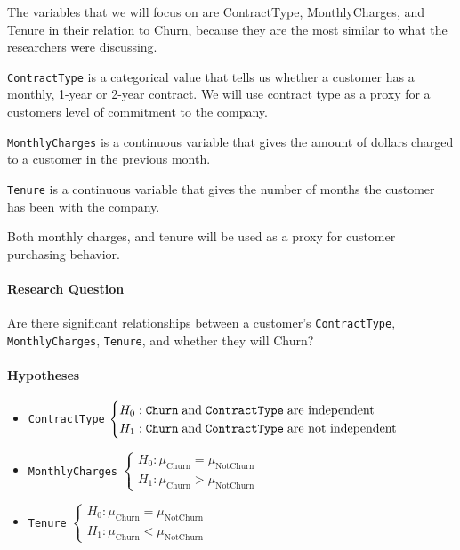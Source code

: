 \documentclass[man, floatsintext]{apa6}
\begin{document}
The variables that we will focus on are ContractType, MonthlyCharges, and Tenure in their relation to Churn, because they are the most similar to what the researchers were discussing.

\texttt{ContractType} is a categorical value that tells us whether a customer has a monthly, 1-year or 2-year contract. We will use contract type as a proxy for a customers level of commitment to the company.

\texttt{MonthlyCharges} is a continuous variable that gives the amount of dollars charged to a customer in the previous month.

\texttt{Tenure} is a continuous variable that gives the number of months the customer has been with the company.

Both monthly charges, and tenure will be used as a proxy for customer purchasing behavior.

\hspace{0.5mm}

\paragraph{Research Question}

Are there significant relationships between a customer's \texttt{ContractType}, \texttt{MonthlyCharges}, \texttt{Tenure}, and whether they will Churn?

\hspace{0.5mm}

\paragraph{Hypotheses}

\begin{itemize}
\item \texttt{ContractType} $\begin{cases}
H_0: \texttt{Churn} \hspace{1mm} \text{and}  \hspace{1mm} \texttt{ContractType} \hspace{1mm} \text{are independent} \\
H_1: \texttt{Churn} \hspace{1mm} \text{and} \hspace{1mm} \texttt{ContractType} \hspace{1mm} \text{are not independent}
\end{cases}$
\item \texttt{MonthlyCharges} $\begin{cases}
H_0: \mu_{\text{Churn}} = \mu_{\text{NotChurn}} \\
H_1: \mu_{\text{Churn}} > \mu_{\text{NotChurn}}
\end{cases}$
\item \texttt{Tenure} $\begin{cases}
H_0: \mu_{\text{Churn}} = \mu_{\text{NotChurn}} \\
H_1: \mu_{\text{Churn}} < \mu_{\text{NotChurn}}
\end{cases}$
\end{itemize}
\end{document}
